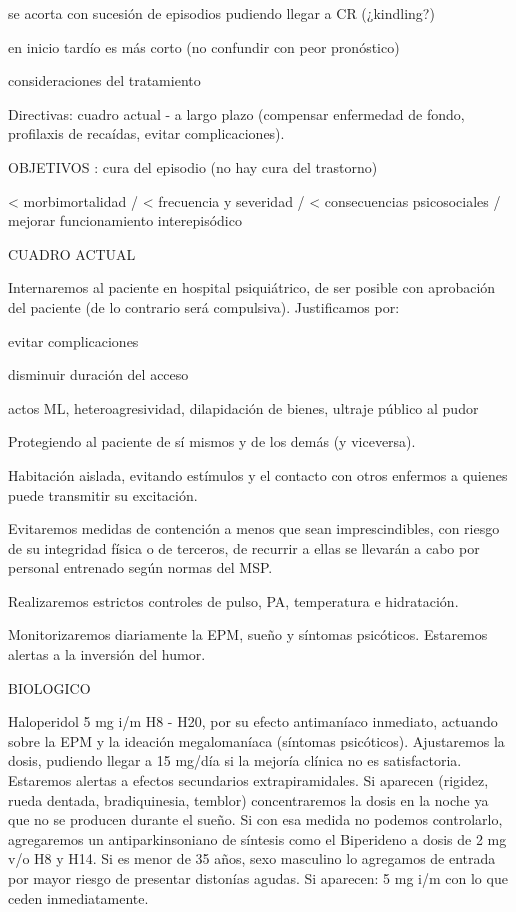 se acorta con sucesión de episodios pudiendo llegar a CR (¿kindling?)

en inicio tardío es más corto (no confundir con peor pronóstico)

consideraciones del tratamiento

Directivas: cuadro actual - a largo plazo (compensar enfermedad de fondo, profilaxis de recaídas, evitar complicaciones).

OBJETIVOS : cura del episodio (no hay cura del trastorno)

< morbimortalidad / < frecuencia y severidad / < consecuencias psicosociales / mejorar funcionamiento interepisódico

CUADRO ACTUAL

Internaremos al paciente en hospital psiquiátrico, de ser posible con aprobación del paciente (de lo contrario será compulsiva). Justificamos por:

evitar complicaciones

disminuir duración del acceso

actos ML, heteroagresividad, dilapidación de bienes, ultraje público al pudor

Protegiendo al paciente de sí mismos y de los demás (y viceversa).

Habitación aislada, evitando estímulos y el contacto con otros enfermos a quienes puede transmitir su excitación.

Evitaremos medidas de contención a menos que sean imprescindibles, con riesgo de su integridad física o de terceros, de recurrir a ellas se llevarán a cabo por personal entrenado según normas del MSP.

Realizaremos estrictos controles de pulso, PA, temperatura e hidratación.

Monitorizaremos diariamente la EPM, sueño y síntomas psicóticos. Estaremos alertas a la inversión del humor.

BIOLOGICO

Haloperidol 5 mg i/m H8 - H20, por su efecto antimaníaco inmediato, actuando sobre la EPM y la ideación megalomaníaca (síntomas psicóticos). Ajustaremos la dosis, pudiendo llegar a 15 mg/día si la mejoría clínica no es satisfactoria. Estaremos alertas a efectos secundarios extrapiramidales. Si aparecen (rigidez, rueda dentada, bradiquinesia, temblor) concentraremos la dosis en la noche ya que no se producen durante el sueño. Si con esa medida no podemos controlarlo, agregaremos un antiparkinsoniano de síntesis como el Biperideno a dosis de 2 mg v/o H8 y H14. Si es menor de 35 años, sexo masculino lo agregamos de entrada por mayor riesgo de presentar distonías agudas. Si aparecen: 5 mg i/m con lo que ceden inmediatamente.

